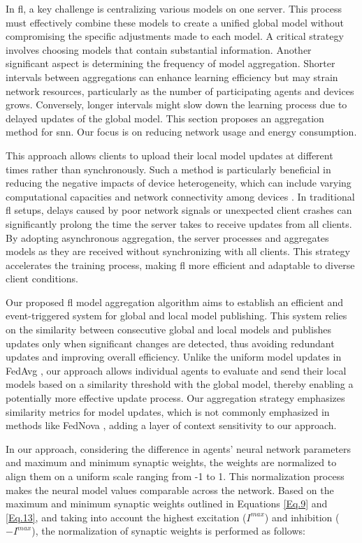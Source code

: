 In \ac{fl}, a key challenge is centralizing various models on one server. This process must effectively combine these models to create a unified global model without compromising the specific adjustments made to each model. A critical strategy involves choosing models that contain substantial information. Another significant aspect is determining the frequency of model aggregation. Shorter intervals between aggregations can enhance learning efficiency but may strain network resources, particularly as the number of participating agents and devices grows. Conversely, longer intervals might slow down the learning process due to delayed updates of the global model. This section proposes an aggregation method for \ac{snn}. Our focus is on reducing network usage and energy consumption.

This approach allows clients to upload their local model updates at different times rather than synchronously. Such a method is particularly beneficial in reducing the negative impacts of device heterogeneity, which can include varying computational capacities and network connectivity among devices \cite{AFL1}. In traditional \ac{fl} setups, delays caused by poor network signals or unexpected client crashes can significantly prolong the time the server takes to receive updates from all clients. By adopting asynchronous aggregation, the server processes and aggregates models as they are received without synchronizing with all clients. This strategy accelerates the training process, making \ac{fl} more efficient and adaptable to diverse client conditions.

Our proposed \ac{fl} model aggregation algorithm aims to establish an efficient and event-triggered system for global and local model publishing. This system relies on the similarity between consecutive global and local models and publishes updates only when significant changes are detected, thus avoiding redundant updates and improving overall efficiency. Unlike the uniform model updates in FedAvg \cite{AFL2, FedAVE}, our approach allows individual agents to evaluate and send their local models based on a similarity threshold with the global model, thereby enabling a potentially more effective update process. Our aggregation strategy emphasizes similarity metrics for model updates, which is not commonly emphasized in methods like FedNova \cite{AFL3}, adding a layer of context sensitivity to our approach.

In our approach, considering the difference in agents' neural network parameters and maximum and minimum synaptic weights, the weights are normalized to align them on a uniform scale ranging from -1 to 1. This normalization process makes the neural model values comparable across the network. Based on the maximum and minimum synaptic weights outlined in Equations \eqref{Eq.9} and \eqref{Eq.13}, and taking into account the highest excitation (\(I^{max}\)) and inhibition (\(-I^{max}\)), the normalization of synaptic weights is performed as follows:

